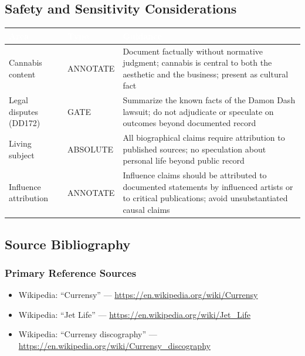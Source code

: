 \documentclass[11pt,letterpaper]{article}
\newcommand{\tableheader}[1]{\textbf{\sffamily\textcolor{white}{#1}}}
\begin{document}
\subsection{Safety and Sensitivity Considerations}

\begin{center}
\begin{tabularx}{\textwidth}{L{3cm}L{2cm}X}
\toprule
{}
\tableheader{Area} & \tableheader{Type} & \tableheader{Guidance} \\
\midrule
Cannabis content & ANNOTATE & Document factually without normative judgment; cannabis is central to both the aesthetic and the business; present as cultural fact \\
Legal disputes (DD172) & GATE & Summarize the known facts of the Damon Dash lawsuit; do not adjudicate or speculate on outcomes beyond documented record \\
Living subject & ABSOLUTE & All biographical claims require attribution to published sources; no speculation about personal life beyond public record \\
Influence attribution & ANNOTATE & Influence claims should be attributed to documented statements by influenced artists or to critical publications; avoid unsubstantiated causal claims \\
\bottomrule
\end{tabularx}
\end{center}

\subsection{Source Bibliography}

\subsubsection{Primary Reference Sources}
\begin{itemize}[leftmargin=1.5em]
  \item Wikipedia: ``Currensy'' — \url{https://en.wikipedia.org/wiki/Currensy}
  \item Wikipedia: ``Jet Life'' — \url{https://en.wikipedia.org/wiki/Jet_Life}
  \item Wikipedia: ``Currensy discography'' — \url{https://en.wikipedia.org/wiki/Currensy_discography}
\end{itemize}
\end{document}
